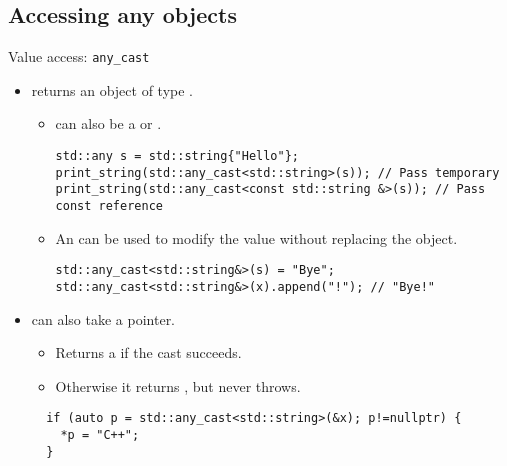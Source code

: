 \subsection{Accessing any objects}

\begin{frame}[t,fragile]{Value access: \texttt{any\_cast}}
\begin{itemize}
  \item {} returns an object of type .
    \begin{itemize}
      \item {} can also be a  or . 
\begin{lstlisting}
std::any s = std::string{"Hello"};
print_string(std::any_cast<std::string>(s)); // Pass temporary
print_string(std::any_cast<const std::string &>(s)); // Pass const reference
\end{lstlisting}

      \item An  can be used to modify the value without
            replacing the object.
\begin{lstlisting}
std::any_cast<std::string&>(s) = "Bye";
std::any_cast<std::string&>(x).append("!"); // "Bye!"
\end{lstlisting}

    \end{itemize}

  \item {} can also take a pointer.
    \begin{itemize}
      \item Returns a  if the cast succeeds.
      \item Otherwise it returns , but never throws.
    \end{itemize}
\begin{lstlisting}
  if (auto p = std::any_cast<std::string>(&x); p!=nullptr) {
    *p = "C++";
  }
\end{lstlisting}

\end{itemize}
\end{frame}

